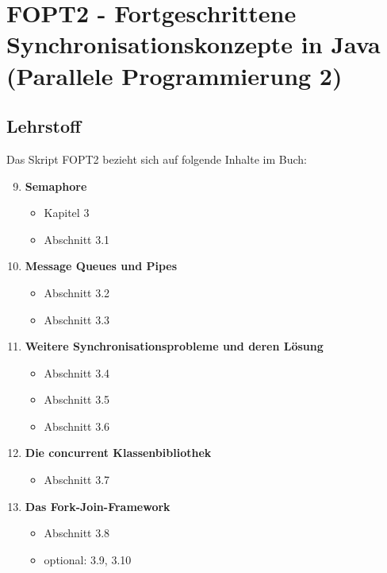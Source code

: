 
\chapter{FOPT2 - Fortgeschrittene Synchronisationskonzepte in Java (Parallele Programmierung 2)}

\section{Lehrstoff}

Das Skript FOPT2 bezieht sich auf folgende Inhalte im Buch:

\begin{tcolorbox}[colback=white!20,color=white]
    \begin{enumerate}
        \setcounter{enumi}{8}
        \item \textbf{Semaphore}
        \begin{itemize}
            \item[] Kapitel 3
            \item[] Abschnitt 3.1
        \end{itemize}

        \item \textbf{Message Queues und Pipes}
        \begin{itemize}
            \item[] Abschnitt 3.2
            \item[] Abschnitt 3.3
        \end{itemize}

        \item \textbf{Weitere Synchronisationsprobleme und deren Lösung}
        \begin{itemize}
            \item[] Abschnitt 3.4
            \item[] Abschnitt 3.5
            \item[] Abschnitt 3.6
        \end{itemize}

        \item \textbf{Die concurrent Klassenbibliothek}
        \begin{itemize}
            \item[] Abschnitt 3.7
        \end{itemize}

        \item \textbf{Das Fork-Join-Framework}
        \begin{itemize}
            \item[] Abschnitt 3.8
            \item[] optional: 3.9, 3.10
        \end{itemize}


\end{enumerate}
\end{tcolorbox}
